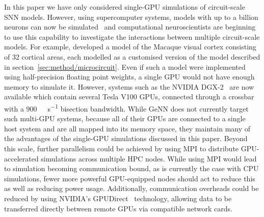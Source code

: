 \documentclass[utf8]{frontiersSCNS} %
\begin{document}
In this paper we have only considered single-GPU simulations of circuit-scale SNN models.
However, using supercomputer systems, models with up to a billion neurons can now be simulated~\citep{Jordan2018} and computational neuroscientists are beginning to use this capability to investigate the interactions between multiple circuit-scale models.
For example, \citet{Schmidt2015} developed a model of the Macaque visual cortex consisting of 32 cortical areas, each modelled as a customised version of the model described in section~\ref{sec:method/microcircuit}.
Even if such a model were implemented using half-precision floating point weights, a single GPU would not have enough memory to simulate it.
However, systems such as the NVIDIA DGX-2~\citep{NVIDIACorporation2018b} are now available which contain several Tesla V100 GPUs, connected through a crossbar with a \SI{900}{\giga\byte\per\second} bisection bandwidth.
While GeNN does not currently target such multi-GPU systems, because all of their GPUs are connected to a single host system and are all mapped into its memory space, they maintain many of the advantages of the single-GPU simulations discussed in this paper.
Beyond this scale, further parallelism could be achieved by using MPI to distribute GPU-accelerated simulations across multiple HPC nodes.
While using MPI would lead to simulation becoming communication bound, as is currently the case with CPU simulations, fewer more powerful GPU-equipped nodes should act to reduce this as well as reducing power usage. 
Additionally, communication overheads could be reduced by using NVIDIA's GPUDirect~\citep{NVIDIACorporation2018c} technology, allowing data to be transferred directly between remote GPUs via compatible network cards.
\end{document}
